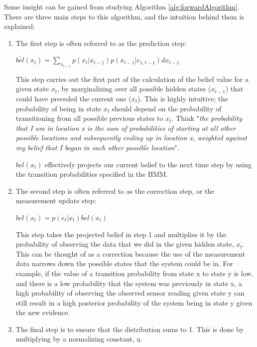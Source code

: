 Some insight can be gained from studying Algorithm \ref{alg:forwardAlgorithm}. There are three main steps to this algorithm, and the intuition behind them is explained: 
\begin{enumerate}
    
    \item The first step is often referred to as the prediction step:
    \begin{center}
    $\overline{bel}(x_t) = \sum_{x_{t-1}} p(x_t | x_{t-1}) p(x_{t-1} | e_{1:t-1}) d x_{t-1}$
    \end{center}

    This step carries out the first part of the calculation of the belief value for a given state $x_t$, by marginalizing over all possible hidden states ($x_{t-1}$) that could have preceded the current one ($x_t$). This is highly intuitive; the probability of being in state $x_t$ should depend on the probability of transitioning from all possible previous states to $x_t$. 
    Think "\textit{the probability that I am in location x is the sum of probabilities of starting at all other possible locations and subsequently ending up in location x, weighted against my belief that I began in each other possible location}".
    
    $\overline{bel}(x_t)$ effectively projects our current belief to the next time step by using the transition probabilities specified in the HMM.
    
    \item The second step is often referred to as the correction step, or the measurement update step: 
    \begin{center}
    $bel(x_t) = p(e_t | x_t) \overline{bel}(x_t)$ 
    \end{center}
    This step takes the projected belief in step 1 and multiplies it by the probability of observing the data that we did in the given hidden state, $x_t$. This can be thought of as a correction because the use of the measurement data narrows down the possible states that the system could be in. 
    For example, if the value of a transition probability from state x to state y is low, and there is a low probability that the system was previously in state x, a high probability of observing the observed sensor reading given state y can still result in a high posterior probability of the system being in state y given the new evidence.
    
    \item The final step is to ensure that the distribution sums to 1. This is done by multiplying by a normalizing constant, $\eta$.
    
    
\end{enumerate}
